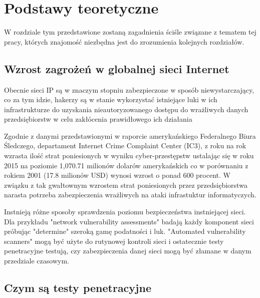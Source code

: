 \chapter{Podstawy teoretyczne}
\label{cha:teoria}

W rozdziale tym przedstawione zostaną zagadnienia ściśle związane z tematem tej pracy, których znajomość niezbędna jest do zrozumienia kolejnych rozdziałów. 




\section{Wzrost zagrożeń w globalnej sieci Internet}
\label{sec:penTest}

Obecnie sieci IP są w znaczym stopniu zabezpieczone w sposób niewystarczający, co za tym idzie, hakerzy są w stanie wykorzystać istniejące luki w ich infrastrukturze do uzyskania nieautoryzowanego dostępu do wrażliwych danych przedsiębiorstw w celu zakłócenia prawidłowego ich działania %


Zgodnie z danymi przedstawionymi w raporcie amerykańskiego Federalnego Biura Śledczego, departament  Internet Crime Complaint Center (IC3), \cite{FBI2015} z roku na rok wzrasta ilość strat poniesionych w wyniku cyber-przestępstw ustalając się w roku 2015 na poziomie 1,070.71 milionów dolarów amerykańskich co w porównaniu z rokiem 2001 (17.8 milionów USD) wynosi wzrost o ponad 600 procent. W związku z tak gwałtownym wzrostem strat poniesionych przez przedsiębiorstwa narasta potrzeba zabezpieczenia wrażliwych na ataki infrastuktur informatyczych. 


Instnieją różne sposoby sprawdzenia poziomu bezpieczeństwa instniejącej sieci. Dla przykładu "network vulnerability assessments" badają każdy komponent sieci próbując "determine" szeroką gamę podatności i luk. "Automated vulnerability
scanners" mogą być użyte do rutynowej kontroli sieci i ostatecznie testy penetracyjne testują, czy zabezpieczenia danej sieci mogą być złamane w danym przedziale czasowym.





\section{Czym są testy penetracyjne}
\label{sec:penTest}

